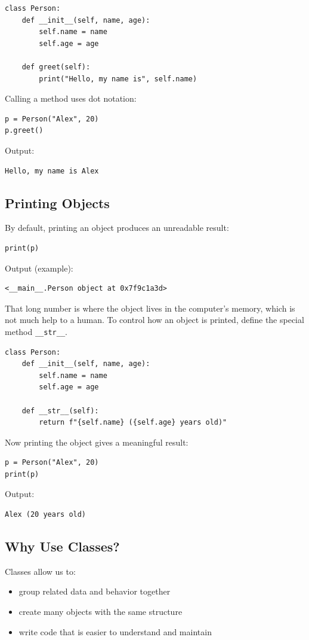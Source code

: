 \begin{verbatim}
class Person:
    def __init__(self, name, age):
        self.name = name
        self.age = age

    def greet(self):
        print("Hello, my name is", self.name)
\end{verbatim}

Calling a method uses dot notation:

\begin{verbatim}
p = Person("Alex", 20)
p.greet()
\end{verbatim}

Output:
\begin{verbatim}
Hello, my name is Alex
\end{verbatim}

\subsection{Printing Objects}
By default, printing an object produces an unreadable result:

\begin{verbatim}
print(p)
\end{verbatim}

Output (example):
\begin{verbatim}
<__main__.Person object at 0x7f9c1a3d>
\end{verbatim}

That long number is where the object lives in the computer's memory, which is not much help to a human. To control how an object is printed, define the special method
\texttt{__str__}.

\begin{verbatim}
class Person:
    def __init__(self, name, age):
        self.name = name
        self.age = age

    def __str__(self):
        return f"{self.name} ({self.age} years old)"
\end{verbatim}

Now printing the object gives a meaningful result:

\begin{verbatim}
p = Person("Alex", 20)
print(p)
\end{verbatim}

Output:
\begin{verbatim}
Alex (20 years old)
\end{verbatim}

\subsection{Why Use Classes?}
Classes allow us to:
\begin{itemize}
    \item group related data and behavior together
    \item create many objects with the same structure
    \item write code that is easier to understand and maintain
\end{itemize}

